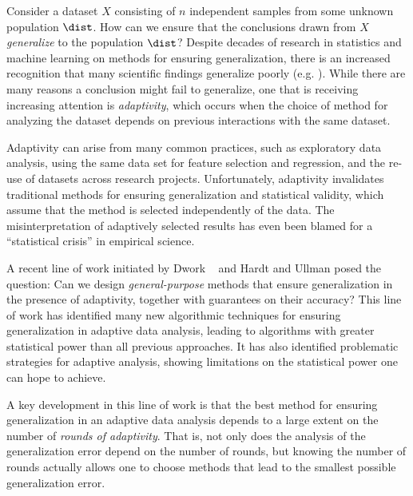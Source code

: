 


Consider a dataset $X$ consisting of $n$ independent samples from some  unknown population $\dist$.  How can we ensure that the conclusions drawn from $X$ \emph{generalize} to the population $\dist$?  Despite decades of research in statistics and machine learning on methods for ensuring generalization, there is an increased recognition that many scientific findings generalize poorly (e.g. 
).  While there are many reasons a conclusion might fail to generalize, one that is receiving increasing attention is \emph{adaptivity}, which occurs when the choice of method for analyzing the dataset depends on previous interactions with the same dataset.

 Adaptivity can arise from many common practices, such as exploratory data analysis, using the same data set for feature selection and regression, and the re-use of datasets across research projects.  Unfortunately, adaptivity invalidates traditional methods for ensuring generalization and statistical validity, which assume that the method is selected independently of the data. The misinterpretation of adaptively selected results has even been blamed for a ``statistical crisis'' in empirical science.

A recent line of work initiated by Dwork \etal~\cite{dwork2015preserving} and Hardt and Ullman posed the question: Can we design \emph{general-purpose} methods that ensure generalization in the presence of adaptivity, together with guarantees on their accuracy?  This line of work has identified many new algorithmic techniques for ensuring generalization in adaptive data analysis, leading to algorithms with greater statistical power than all previous approaches.  It has also identified problematic strategies for adaptive analysis, showing limitations on the statistical power one can hope to achieve.

A key development in this line of work is that the best method for ensuring generalization in an adaptive data analysis depends to a large extent on the number of \emph{rounds of adaptivity}. That is, not only does the analysis of the generalization error depend on the number of rounds, but knowing the number of rounds actually allows one to choose methods that lead to the smallest possible generalization error.

